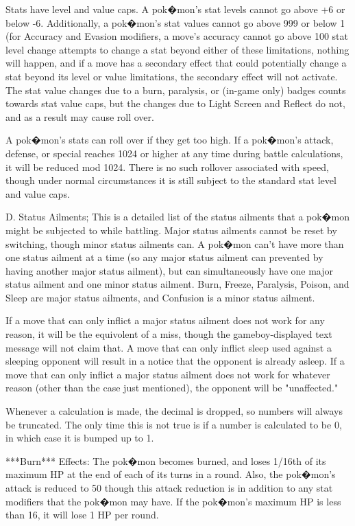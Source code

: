 \documentclass[reprint, aps, prl, paper=A4]{revtex4-1}
\begin{document}
Stats have level and value caps. A pok�mon's stat levels cannot go above +6 or below -6.
Additionally, a pok�mon's stat values cannot go above 999 or below 1 (for Accuracy and Evasion
modifiers, a move's accuracy cannot go above 100%
stat level change attempts to change a stat beyond either of these limitations, nothing will
happen, and if a move has a secondary effect that could potentially change a stat beyond its
level or value limitations, the secondary effect will not activate. The stat value changes due
to a burn, paralysis, or (in-game only) badges counts towards stat value caps, but the changes
due to Light Screen and Reflect do not, and as a result may cause roll over.

A pok�mon's stats can roll over if they get too high. If a pok�mon's attack, defense, or
special reaches 1024 or higher at any time during battle calculations, it will be reduced mod
1024. There is no such rollover associated with speed, though under normal circumstances it is
still subject to the standard stat level and value caps.



D. Status Ailments;
This is a detailed list of the status ailments that a pok�mon might be subjected to while
battling. Major status ailments cannot be reset by switching, though minor status ailments can.
A pok�mon can't have more than one status ailment at a time (so any major status ailment can
prevented by having another major status ailment), but can simultaneously have one major status
ailment and one minor status ailment. Burn, Freeze, Paralysis, Poison, and Sleep are major
status ailments, and Confusion is a minor status ailment.

If a move that can only inflict a major status ailment does not work for any reason, it will be
the equivolent of a miss, though the gameboy-displayed text message will not claim that. A move
that can only inflict sleep used against a sleeping opponent will result in a notice that the
opponent is already asleep. If a move that can only inflict a major status ailment does not
work for whatever reason (other than the case just mentioned), the opponent will be
"unaffected."

Whenever a calculation is made, the decimal is dropped, so numbers will always be truncated.
The only time this is not true is if a number is calculated to be 0, in which case it is bumped
up to 1.


***Burn***
Effects: The pok�mon becomes burned, and loses 1/16th of its maximum HP at the end of each of
its turns in a round. Also, the pok�mon's attack is reduced to 50%
though this attack reduction is in addition to any stat modifiers that the pok�mon may have. If
the pok�mon's maximum HP is less than 16, it will lose 1 HP per round.
\end{document}
